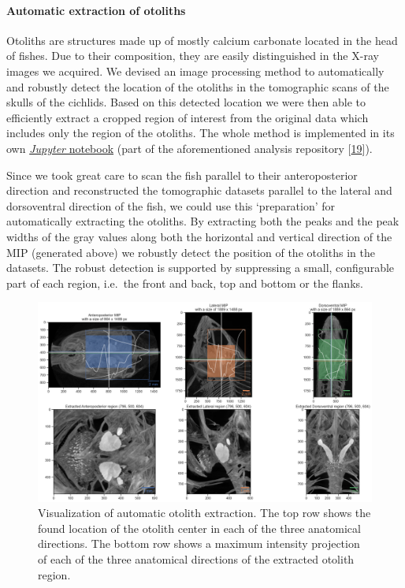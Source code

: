\hypertarget{automatic-extraction-of-otoliths}{%
\paragraph{Automatic extraction of otoliths}\label{automatic-extraction-of-otoliths}}

Otoliths are structures made up of mostly calcium carbonate located in the head of fishes.
Due to their composition, they are easily distinguished in the X-ray images we acquired.
We devised an image processing method to automatically and robustly detect the location of the otoliths in the tomographic scans of the skulls of the cichlids.
Based on this detected location we were then able to efficiently extract a cropped region of interest from the original data which includes only the region of the otoliths.
The whole method is implemented in its own \href{https://github.com/habi/EAWAG/blob/master/ExtractOtoliths.ipynb}{\emph{Jupyter} notebook} (part of the aforementioned analysis repository {[}\protect\hyperlink{ref-1HteOscVd}{19}{]}).

Since we took great care to scan the fish parallel to their anteroposterior direction and reconstructed the tomographic datasets parallel to the lateral and dorsoventral direction of the fish, we could use this `preparation' for automatically extracting the otoliths.
By extracting both the peaks and the peak widths of the gray values along both the horizontal and vertical direction of the MIP (generated above) we robustly detect the position of the otoliths in the datasets.
The robust detection is supported by suppressing a small, configurable part of each region, i.e.~the front and back, top and bottom or the flanks.

\begin{figure}
\hypertarget{fig:otolithextraction}{%
\centering
\includegraphics{images/104016.head.rec.otolither.position.png}
\caption{Visualization of automatic otolith extraction.
The top row shows the found location of the otolith center in each of the three anatomical directions.
The bottom row shows a maximum intensity projection of each of the three anatomical directions of the extracted otolith region.}\label{fig:otolithextraction}
}
\end{figure}

